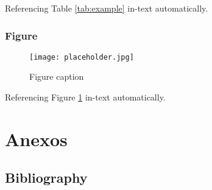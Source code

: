 \documentclass[
	12pt, %
	fleqn, %
	a4paper, %
	oneside, %
]{LegrandOrangeBook}
\begin{document}
Referencing Table \ref{tab:example} in-text automatically.


\section{Figure}
\begin{figure}[h]
\centering\texttt{[image: placeholder.jpg]}
\caption{Figure caption}
\label{fig:placeholder} %
\end{figure}

Referencing Figure \ref{fig:placeholder} in-text automatically.
\part{Anexos}
\stopcontents[part] %


\chapterspaceabove{6.75cm} %
\chapterspacebelow{7.25cm} %

\chapter*{Bibliography}
\end{document}
